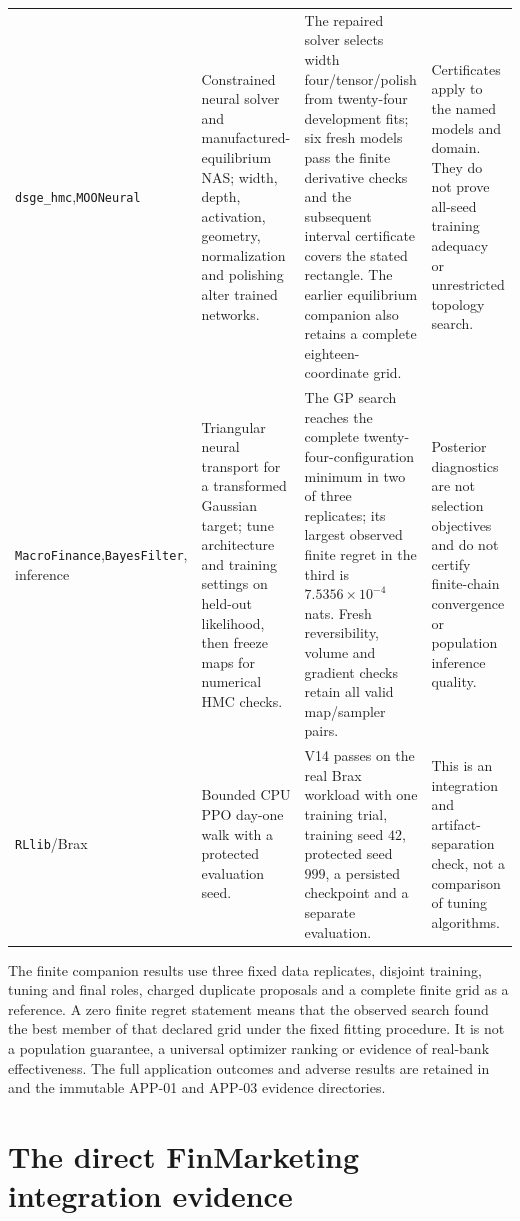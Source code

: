 \begin{longtable}{p{}p{}p{}p{}}
\texttt{dsge\_hmc},\newline \texttt{MOONeural} & Constrained neural solver and manufactured-equilibrium NAS; width, depth, activation, geometry, normalization and polishing alter trained networks. & The repaired solver selects width four/tensor/polish from twenty-four development fits; six fresh models pass the finite derivative checks and the subsequent interval certificate covers the stated rectangle. The earlier equilibrium companion also retains a complete eighteen-coordinate grid. & Certificates apply to the named models and domain. They do not prove all-seed training adequacy or unrestricted topology search.\\
\texttt{MacroFinance},\newline \texttt{BayesFilter}, inference & Triangular neural transport for a transformed Gaussian target; tune architecture and training settings on held-out likelihood, then freeze maps for numerical HMC checks. & The GP search reaches the complete twenty-four-configuration minimum in two of three replicates; its largest observed finite regret in the third is $7.5356\times10^{-4}$ nats. Fresh reversibility, volume and gradient checks retain all valid map/sampler pairs. & Posterior diagnostics are not selection objectives and do not certify finite-chain convergence or population inference quality.\\
\texttt{RLlib}/Brax & Bounded CPU PPO day-one walk with a protected evaluation seed. & V14 passes on the real Brax workload with one training trial, training seed $42$, protected seed $999$, a persisted checkpoint and a separate evaluation. & This is an integration and artifact-separation check, not a comparison of tuning algorithms.\\
\bottomrule
\end{longtable}

The finite companion results use three fixed data replicates, disjoint training,
tuning and final roles, charged duplicate proposals and a complete finite grid
as a reference. A zero finite regret statement means that the observed search
found the best member of that declared grid under the fixed fitting procedure.
It is not a population guarantee, a universal optimizer ranking or evidence of
real-bank effectiveness. The full application outcomes and adverse results are
retained in  and the immutable APP-01
and APP-03 evidence directories.

\section{The direct FinMarketing integration evidence}

